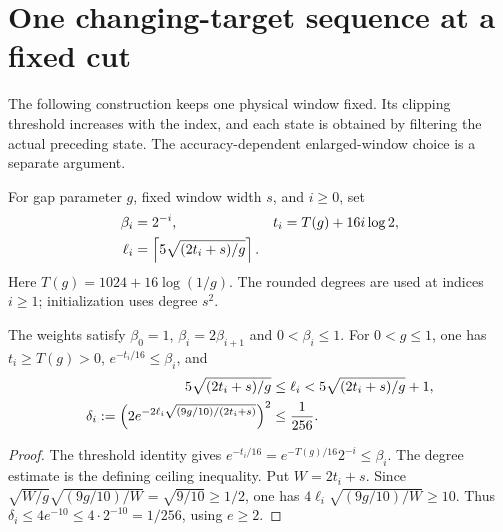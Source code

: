 \section{One changing-target sequence at a fixed cut}

The following construction keeps one physical window fixed. Its clipping
threshold increases with the index, and each state is obtained by filtering
the actual preceding state. The accuracy-dependent enlarged-window choice
is a separate argument.

\begin{definition}
    \label{def:aklv_sequence_parameters}
    \leanok
    For gap parameter $g$, fixed window width $s$, and $i\ge0$, set
    \begin{align*}
        \beta_i & =2^{-i},                                    & t_i & =T(g)+16i\log2,\notag \\
        \ell_i  & =\left\lceil5\sqrt{(2t_i+s)/g}\right\rceil.
    \end{align*}
    Here $T(g)=1024+16\log(1/g)$. The rounded degrees are used at indices
    $i\ge1$; initialization uses degree $s^2$.
\end{definition}

\begin{lemma}
    \label{thm:aklv_sequence_parameter_bounds}
    \leanok
    The weights satisfy $\beta_0=1$, $\beta_i=2\beta_{i+1}$ and
    $0<\beta_i\le1$. For $0<g\le1$, one has $t_i\ge T(g)>0$,
    $e^{-t_i/16}\le\beta_i$, and
    \begin{align*}
        5\sqrt{(2t_i+s)/g} & \le\ell_i<5\sqrt{(2t_i+s)/g}+1,\notag \\
        \delta_i:=\left(2e^{-2\ell_i\sqrt{(9g/10)/(2t_i+s)}}\right)^2
                           & \le\frac1{256}.
    \end{align*}
\end{lemma}
\begin{proof}
    \leanok
    The threshold identity gives
    $e^{-t_i/16}=e^{-T(g)/16}2^{-i}\le\beta_i$.
    The degree estimate is the defining ceiling inequality. Put $W=2t_i+s$.
    Since
    $\sqrt{W/g}\sqrt{(9g/10)/W}=\sqrt{9/10}\ge1/2$,
    one has $4\ell_i\sqrt{(9g/10)/W}\ge10$.
    Thus $\delta_i\le4e^{-10}\le4\cdot2^{-10}=1/256$, using $e\ge2$.
\end{proof}

